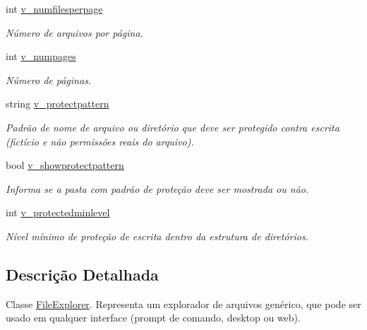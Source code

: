\begin{DoxyCompactItemize}
int \hyperlink{classSpartacus_1_1Utils_1_1FileExplorer_abbf2deab4665a8be42c23393bdbf54df}{v\+\_\+numfilesperpage}
\begin{DoxyCompactList}\small\item\em Número de arquivos por página. \end{DoxyCompactList}\item 
int \hyperlink{classSpartacus_1_1Utils_1_1FileExplorer_a8017af938b655e57eb51eb83fba48ed6}{v\+\_\+numpages}
\begin{DoxyCompactList}\small\item\em Número de páginas. \end{DoxyCompactList}\item 
string \hyperlink{classSpartacus_1_1Utils_1_1FileExplorer_a1e0f31dd0c66b2a6d5003a0ace555eab}{v\+\_\+protectpattern}
\begin{DoxyCompactList}\small\item\em Padrão de nome de arquivo ou diretório que deve ser protegido contra escrita (fictício e não permissões reais do arquivo). \end{DoxyCompactList}\item 
bool \hyperlink{classSpartacus_1_1Utils_1_1FileExplorer_adba2289bce9aadfdbb353f811fa0411c}{v\+\_\+showprotectpattern}
\begin{DoxyCompactList}\small\item\em Informa se a pasta com padrão de proteção deve ser mostrada ou não. \end{DoxyCompactList}\item 
int \hyperlink{classSpartacus_1_1Utils_1_1FileExplorer_a471c35d5854d9f4dbf605da187f262b1}{v\+\_\+protectedminlevel}
\begin{DoxyCompactList}\small\item\em Nível mínimo de proteção de escrita dentro da estrutura de diretórios. \end{DoxyCompactList}\end{DoxyCompactItemize}


\subsection{Descrição Detalhada}
Classe \hyperlink{classSpartacus_1_1Utils_1_1FileExplorer}{File\+Explorer}. Representa um explorador de arquivos genérico, que pode ser usado em qualquer interface (prompt de comando, desktop ou web). 



